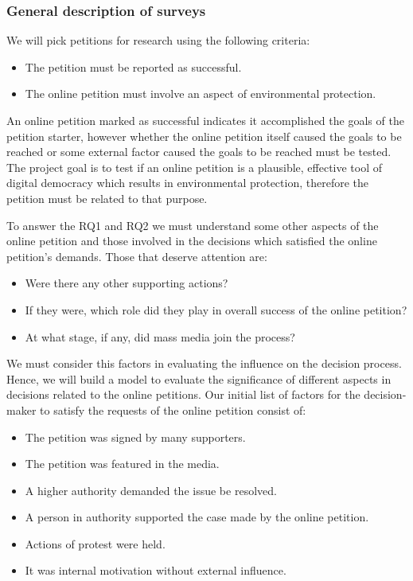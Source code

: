 \subsubsection{General description of surveys}
We will pick petitions for research using the following criteria:
\begin{itemize}
\item The petition must be reported as successful.
\item The online petition must involve an aspect of environmental protection.
\end{itemize}
An online petition marked as successful indicates it accomplished the goals of the petition starter, however whether the online petition itself caused the goals to be reached or some external factor caused the goals to be reached must be tested. The project goal is to test if an online petition is a plausible, effective tool of digital democracy which results in environmental protection, therefore the petition must be related to that purpose.\par\vspace{0.2cm}

To answer the RQ1 and RQ2 we must understand some other aspects of the online petition and those involved in the decisions which satisfied the online petition's demands. Those that deserve attention are:

\begin{itemize}
\item Were there any other supporting actions?
\item If they were, which role did they play in overall success of the online petition?
\item At what stage, if any, did mass media join the process?
\end{itemize}

We must consider this factors in evaluating the influence on the decision process. Hence, we will build a model to evaluate the significance of different aspects in decisions related to the online petitions. Our initial list of factors for the decision-maker to satisfy the requests of the online petition consist of:

\begin{itemize}
\item The petition was signed by many supporters.
\item The petition was featured in the media.
\item A higher authority demanded the issue be resolved.
\item A person in authority supported the case made by the online petition.
\item Actions of protest were held.
\item It was internal motivation without external influence.
\end{itemize}

